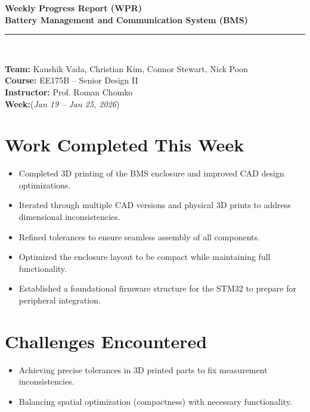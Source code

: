 \documentclass[12pt]{article}
\begin{document}
\begin{center}
    {\Large \textbf{Weekly Progress Report (WPR)}} \\[6pt]
    {\large \textbf{Battery Management and Communication System (BMS)}} \\[2pt]
    \rule{0.8\textwidth}{0.5pt} \\[6pt]
\end{center}

\noindent
\textbf{Team:} Kaushik Vada, Christian Kim, Connor Stewart, Nick Poon \\[3pt]
\textbf{Course:} EE175B – Senior Design II \\
\textbf{Instructor:} Prof. Roman Chomko \\
\textbf{Week:}(\textit{Jan 19 – Jan 25, 2026}) \\[8pt]

\vspace{1em}

\section{Work Completed This Week}
\begin{itemize}[leftmargin=1cm]
    \item Completed 3D printing of the BMS enclosure and improved CAD design optimizations.
    \item Iterated through multiple CAD versions and physical 3D prints to address dimensional inconsistencies.
    \item Refined tolerances to ensure seamless assembly of all components.
    \item Optimized the enclosure layout to be compact while maintaining full functionality.
    \item Established a foundational firmware structure for the STM32 to prepare for peripheral integration.
\end{itemize}

\vspace{1em}

\section{Challenges Encountered}
\begin{itemize}[leftmargin=1cm]
    \item Achieving precise tolerances in 3D printed parts to fix measurement inconsistencies.
    \item Balancing spatial optimization (compactness) with necessary functionality.
\end{itemize}
\end{document}
